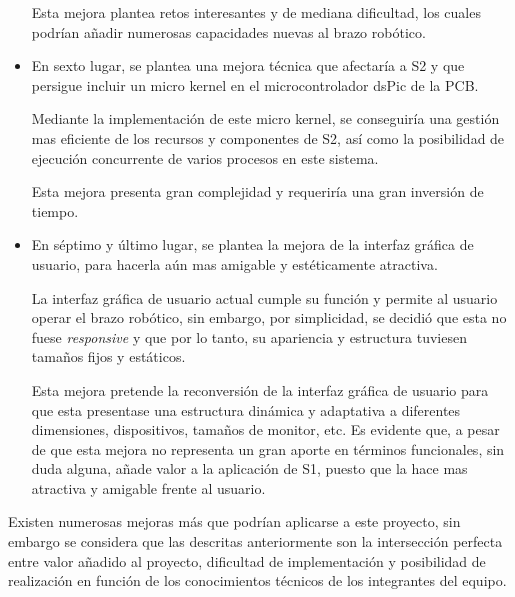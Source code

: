 \begin{itemize}
    Esta mejora plantea retos interesantes y de mediana dificultad, los cuales podrían añadir numerosas capacidades nuevas al brazo robótico.
    
    \item En sexto lugar, se plantea una mejora técnica que afectaría a \ac{S2} y que persigue incluir un micro kernel en el microcontrolador dsPic de la PCB.
    
    Mediante la implementación de este micro kernel, se conseguiría una gestión mas eficiente de los recursos y componentes de \ac{S2}, así como la posibilidad de ejecución concurrente de varios procesos en este sistema.
    
    Esta mejora presenta gran complejidad y requeriría una gran inversión de tiempo.
    
    \item En séptimo y último lugar, se plantea la mejora de la interfaz gráfica de usuario, para hacerla aún mas amigable y estéticamente atractiva.
    
    La interfaz gráfica de usuario actual cumple su función y permite al usuario operar el brazo robótico, sin embargo, por simplicidad, se decidió que esta no fuese \textit{responsive} y que por lo tanto, su apariencia y estructura tuviesen tamaños fijos y estáticos.
    
    Esta mejora pretende la reconversión de la interfaz gráfica de usuario para que esta presentase una estructura dinámica y adaptativa a diferentes dimensiones, dispositivos, tamaños de monitor, etc. Es evidente que, a pesar de que esta mejora no representa un gran aporte en términos funcionales, sin duda alguna, añade valor a la aplicación de \ac{S1}, puesto que la hace mas atractiva y amigable frente al usuario.

\end{itemize}

Existen numerosas mejoras más que podrían aplicarse a este proyecto, sin embargo se considera que las descritas anteriormente son la intersección perfecta entre valor añadido al proyecto, dificultad de implementación y posibilidad de realización en función de los conocimientos técnicos de los integrantes del equipo.
